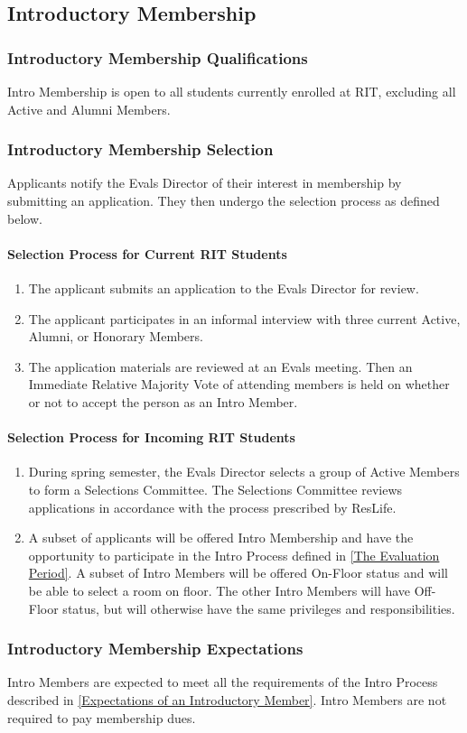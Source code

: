 \documentclass{article}
\newcommand{\asection}[1]{\subsection{#1} \label{#1}}
\newcommand{\asubsection}[1]{\subsubsection{#1} \label{#1}}
\newcommand{\asubsubsection}[1]{\paragraph{#1} \label{#1}}
\begin{document}
\asection{Introductory Membership}

\asubsection{Introductory Membership Qualifications}
Intro Membership is open to all students currently enrolled at RIT, excluding all Active and Alumni Members.

\asubsection{Introductory Membership Selection}
Applicants notify the Evals Director of their interest in membership by submitting an application.
They then undergo the selection process as defined below.

\asubsubsection{Selection Process for Current RIT Students}
\renewcommand{\theenumi}{\arabic{enumi}} %
\begin{enumerate}
	\item The applicant submits an application to the Evals Director for review.
	\item The applicant participates in an informal interview with three current Active, Alumni, or Honorary Members.
	\item The application materials are reviewed at an Evals meeting.
	      Then an Immediate Relative Majority Vote of attending members is held on whether or not to accept the person as an Intro Member.
\end{enumerate}

\asubsubsection{Selection Process for Incoming RIT Students}
\begin{enumerate}
	\item During spring semester, the Evals Director selects a group of Active Members to form a Selections Committee.
	      The Selections Committee reviews applications in accordance with the process prescribed by ResLife.
	\item A subset of applicants will be offered Intro Membership and have the opportunity to participate in the Intro Process defined in \ref{The Evaluation Period}.
	      A subset of Intro Members will be offered On-Floor status and will be able to select a room on floor.
	      The other Intro Members will have Off-Floor status, but will otherwise have the same privileges and responsibilities.
\end{enumerate}

\asubsection{Introductory Membership Expectations}
Intro Members are expected to meet all the requirements of the Intro Process described in \ref{Expectations of an Introductory Member}.
Intro Members are not required to pay membership dues.
\end{document}
